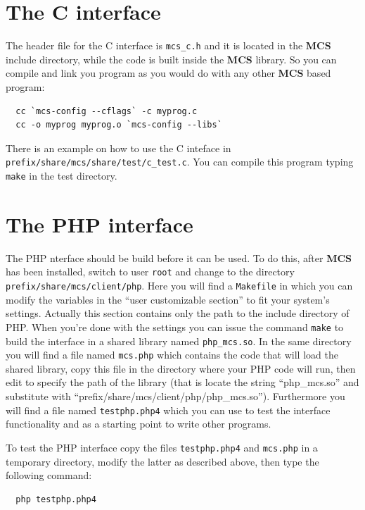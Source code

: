 \documentclass[12pt,titlepage]{book}
\newcommand{\mcs}{\textbf{MCS} }
\begin{document}
\section{The C interface}
\label{sec-The C interface}
The header file for the C interface is \verb|mcs_c.h| and it is located in the
\mcs include directory, while the code is built inside the \mcs library. So
you can compile and link you program as you would do with any other \mcs based
program:
\begin{verbatim}
  cc `mcs-config --cflags` -c myprog.c
  cc -o myprog myprog.o `mcs-config --libs`
\end{verbatim}

\noindent There is an example on how to use the C inteface in
\verb|prefix/share/mcs/share/test/c_test.c|. You can compile this program
typing \verb|make| in the test directory.


\section{The PHP interface}
\label{sec-The PHP interface}
The PHP nterface should be build before it can be used. To do this, after \mcs
has been installed, switch to user \verb|root| and change to the directory
\verb|prefix/share/mcs/client/php|.  Here you will find a \verb|Makefile| in
which you can modify the variables in the ``user customizable section'' to fit
your system's settings. Actually this section contains only the path to the
include directory of PHP.  When you're done with
the settings you can issue the command \verb|make| to build the interface in a
shared library named \verb|php_mcs.so|. In the same directory you will
find a file named \verb|mcs.php| which contains the code that will load the
shared library, copy this file in the directory where your PHP code will run,
then edit to specify the path of the library (that is locate the string
``php\_mcs.so'' and substitute with
``prefix/share/mcs/client/php/php\_mcs.so''). Furthermore you will find a
file named \verb|testphp.php4| which you can use to test the interface
functionality and as a starting point to write other programs.

\noindent To test the PHP interface copy the files \verb|testphp.php4| and
\verb|mcs.php| in a temporary directory, modify the latter as described above,
then type the following command:
\begin{verbatim}
  php testphp.php4
\end{verbatim}
\end{document}
